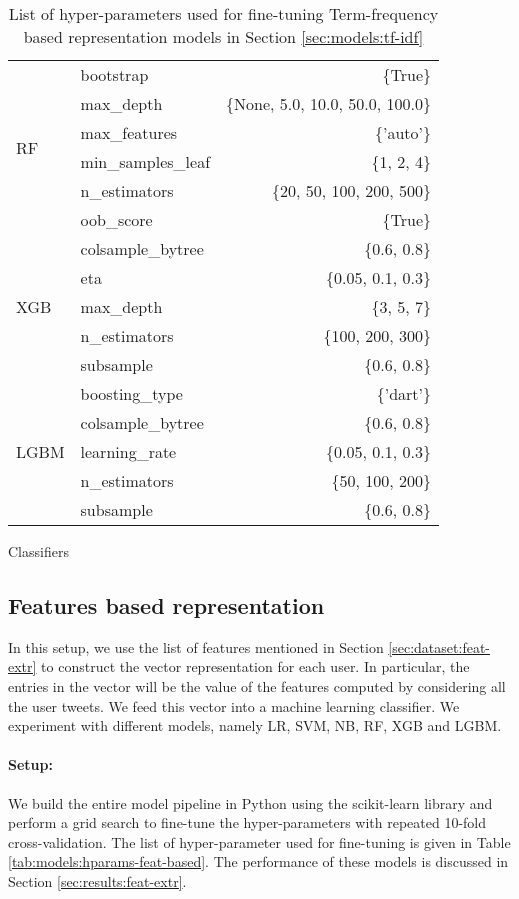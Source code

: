 \begin{table}[htbp]
\begin{subtable}{\textwidth}
\begin{tabular}{llr}
\multirow{6}{*}{RF} & bootstrap & \{True\} \\
 & max\_depth & \{None, 5.0, 10.0, 50.0, 100.0\} \\
 & max\_features & \{'auto'\} \\
 & min\_samples\_leaf & \{1, 2, 4\} \\
 & n\_estimators & \{20, 50, 100, 200, 500\} \\
 & oob\_score & \{True\} \\
\hline
\multirow{5}{*}{XGB} & colsample\_bytree & \{0.6, 0.8\} \\
 & eta & \{0.05, 0.1, 0.3\} \\
 & max\_depth & \{3, 5, 7\} \\
 & n\_estimators & \{100, 200, 300\} \\
 & subsample & \{0.6, 0.8\} \\
\hline
\multirow{5}{*}{LGBM} & boosting\_type & \{'dart'\} \\
 & colsample\_bytree & \{0.6, 0.8\} \\
 & learning\_rate & \{0.05, 0.1, 0.3\} \\
 & n\_estimators & \{50, 100, 200\} \\
 & subsample & \{0.6, 0.8\} \\
\hline
\end{tabular}
\caption{Classifiers}
\end{subtable}
\caption{List of hyper-parameters used for fine-tuning Term-frequency based representation models in Section \ref{sec:models:tf-idf}}
\label{tab:models:hparams-tf-based}
\end{table}

\subsection{Features based representation}
\label{sec:models:feat-based}
In this setup, we use the list of features mentioned in Section \ref{sec:dataset:feat-extr} to construct the vector representation for each user. In particular, the entries in the vector will be the value of the features computed by considering all the user tweets. We feed this vector into a machine learning classifier. We experiment with different models, namely \ac{LR}, \ac{SVM}, \ac{NB}, \ac{RF}, \ac{XGB} and \ac{LGBM}. 

\paragraph{Setup:} We build the entire model pipeline in Python using the scikit-learn library and perform a grid search to fine-tune the hyper-parameters with repeated 10-fold cross-validation. The list of hyper-parameter used for fine-tuning is given in Table \ref{tab:models:hparams-feat-based}. The performance of these models is discussed in Section \ref{sec:results:feat-extr}.

